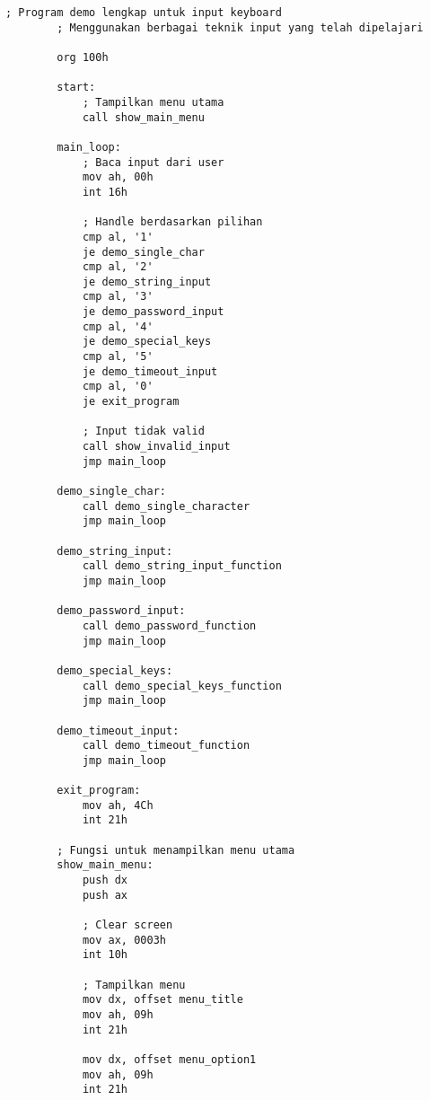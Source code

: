 \documentclass[../main.tex]{subfiles}
\begin{document}
        \begin{lstlisting}[language={[x86masm]Assembler}, caption=Program Lengkap - Keyboard Input Demo, label={lst:complete-demo}]
        ; Program demo lengkap untuk input keyboard
        ; Menggunakan berbagai teknik input yang telah dipelajari
        
        org 100h
        
        start:
            ; Tampilkan menu utama
            call show_main_menu
            
        main_loop:
            ; Baca input dari user
            mov ah, 00h
            int 16h
            
            ; Handle berdasarkan pilihan
            cmp al, '1'
            je demo_single_char
            cmp al, '2'
            je demo_string_input
            cmp al, '3'
            je demo_password_input
            cmp al, '4'
            je demo_special_keys
            cmp al, '5'
            je demo_timeout_input
            cmp al, '0'
            je exit_program
            
            ; Input tidak valid
            call show_invalid_input
            jmp main_loop
            
        demo_single_char:
            call demo_single_character
            jmp main_loop
            
        demo_string_input:
            call demo_string_input_function
            jmp main_loop
            
        demo_password_input:
            call demo_password_function
            jmp main_loop
            
        demo_special_keys:
            call demo_special_keys_function
            jmp main_loop
            
        demo_timeout_input:
            call demo_timeout_function
            jmp main_loop
            
        exit_program:
            mov ah, 4Ch
            int 21h
        
        ; Fungsi untuk menampilkan menu utama
        show_main_menu:
            push dx
            push ax
            
            ; Clear screen
            mov ax, 0003h
            int 10h
            
            ; Tampilkan menu
            mov dx, offset menu_title
            mov ah, 09h
            int 21h
            
            mov dx, offset menu_option1
            mov ah, 09h
            int 21h
            

\end{lstlisting}
\end{document}
